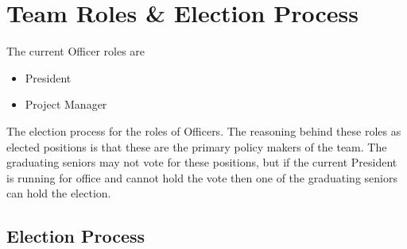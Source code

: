 \section{Team Roles \& Election Process}
\label{roles}
The current Officer roles are
\begin{itemize}
\item President
\item Project Manager
\end{itemize}
The election process for the roles of Officers. The reasoning behind these roles as elected positions is that these are the primary policy makers of the team. The graduating seniors may not vote for these positions, but if the current President is running for office and cannot hold the vote then one of the graduating seniors can hold the election.

\subsection{Election Process}
\label{roles:process}
